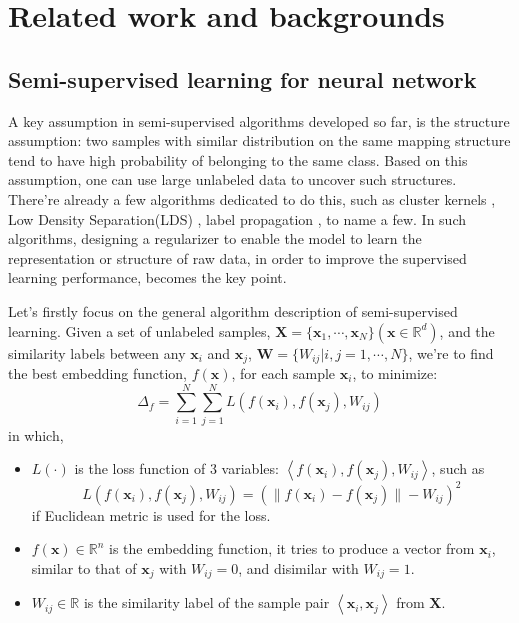 \documentclass[3p,times,procedia]{elsarticle}
\begin{document}
\section{Related work and backgrounds}

\subsection{Semi-supervised learning for
neural network}
A key assumption in semi-supervised 
algorithms developed so far, is the 
structure assumption: two samples with 
similar distribution on the same mapping 
structure tend to have high probability 
of belonging to the same class. Based on 
this assumption, one can use large 
unlabeled data to uncover such 
structures. There're already a few 
algorithms dedicated to do this,
such as cluster kernels
\cite{chapelle2003cluster},
Low Density Separation(LDS)
\cite{chapelle2005semi},
label propagation
\cite{zhu2002learning},
to name a few.
In such algorithms, designing a regularizer
to enable the model to learn the representation
or structure of raw data, in order to improve
the supervised learning performance, becomes
the key point.

Let's firstly focus on the general algorithm
description of semi-supervised learning.
Given a set of unlabeled samples,
$\mathbf{X}=\{\mathbf{x}_1,\cdots,
\mathbf{x}_N\}(\mathbf{x}\in\mathbb{R}^d)$,
and the similarity labels between any
$\mathbf{x}_i$ and $\mathbf{x}_j$,
$\mathbf{W}=\{W_{ij}|i,j=1,\cdots,N\}$,
we're to find the best embedding function, 
$f(\mathbf{x})$, for each sample $\mathbf{x}_i$, 
to minimize:
\begin{equation}
\Delta_{f}=
	\sum^{N}_{i=1}
	\sum^{N}_{j=1}
	L\left(
	f(\mathbf{x}_i),
	f(\mathbf{x}_j),
	W_{ij}
	\right)
\label{eq:1}
\end{equation}
in which,
\begin{itemize}[]
\item $L(\cdot)$ is the loss function of 3 
variables: 
$\left<
		f(\mathbf{x}_i),
		f(\mathbf{x}_j),
		W_{ij}
		\right>$, 
such as 
		$$L\left(
		f(\mathbf{x}_i),
		f(\mathbf{x}_j),
		W_{ij}
		\right) = 
		\left(
		\|f(\mathbf{x}_i)-
		f(\mathbf{x}_j)
		\|-W_{ij}
		\right)^2$$
if Euclidean metric is used for the loss.
\item $f(\mathbf{x})\in\mathbb{R}^n$ is the 
embedding function, it tries to produce a 
vector from $\mathbf{x}_i$, similar to that 
of $\mathbf{x}_j$ with $W_{ij}=0$,
and disimilar with $W_{ij}=1$.
\item $W_{ij}\in \mathbb{R}$ is the similarity 
label of the sample pair
$\left<
		\mathbf{x}_i,
		\mathbf{x}_j
		\right>$ from $\mathbf{X}$.
\end{itemize}
\end{document}
